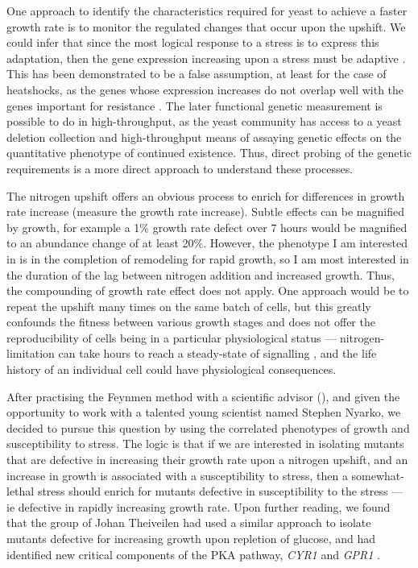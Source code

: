 One approach to identify the characteristics required for yeast to 
achieve a faster growth rate is to monitor the regulated changes that
occur upon the upshift. We could infer
that since the most logical response to a stress is to express this
adaptation, then the gene expression increasing upon a stress must be
adaptive \parencite{gould}. 
This has been demonstrated to be a false assumption, at least for the
case of heatshocks, as the genes whose expression increases do not 
overlap well with the
genes important for resistance \parencite{lee li botstein}.
The later functional genetic measurement is possible to do in 
high-throughput, as
the yeast community has access to a yeast deletion collection and
high-throughput means of assaying genetic effects on the quantitative
phenotype of continued existence. 
Thus, direct probing of the genetic requirements is a more direct
approach to understand these processes.

The nitrogen upshift offers an obvious process to enrich for
differences in growth rate increase (measure the growth rate
increase). Subtle effects can be magnified by growth, for example a
1\% growth rate defect over 7 hours would be magnified to an abundance
change of at least 20\%. However, the phenotype I am interested in is
in the completion of remodeling for rapid growth, so I am most
interested in the duration of the lag between nitrogen addition and
increased growth. Thus, the compounding of growth rate effect does not 
apply. One approach would be to repeat the upshift many times on the
same batch of cells, but this greatly confounds the fitness between 
various growth stages and does not offer the reproducibility of cells
being in a particular physiological status --- nitrogen-limitation can
take hours to reach a steady-state of signalling
\parencite{tate2013five}, and the life history of an individual cell
could have physiological consequences.

After practising the Feynmen method with a scientific advisor
(), and given
the opportunity to work with a talented young scientist named Stephen
Nyarko, we decided to pursue this question by using the correlated
phenotypes of growth and susceptibility to stress.
The logic is that if we are interested in isolating mutants that are
defective in increasing their growth rate upon a nitrogen upshift, and
an increase in growth is associated with a susceptibility to stress,
then a somewhat-lethal stress should enrich for mutants defective in
susceptibility to the stress --- ie defective in rapidly increasing 
growth rate.
Upon further reading, we found that the group of Johan Theiveilen had
used a similar approach to isolate mutants defective for increasing
growth upon repletion of glucose, and had identified new critical
components of the PKA pathway, \textit{CYR1} and \textit{GPR1}
\parencite{vandjick2000}.

